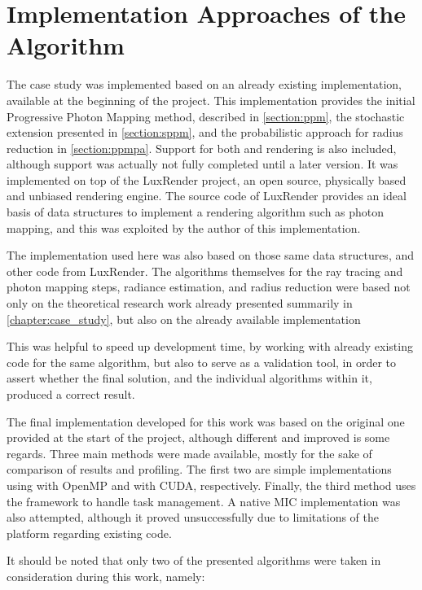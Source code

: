 \documentclass[main.tex]{subfiles}
\begin{document}
\chapter{Implementation Approaches of the Algorithm} \label{chapter:impl}

The case study was implemented based on an already existing implementation, available at the beginning of the project. This implementation provides the initial Progressive Photon Mapping method, described in \cref{section:ppm}, the stochastic extension presented in \cref{section:sppm}, and the probabilistic approach for radius reduction in \cref{section:ppmpa}. Support for both \cpu and \cuda rendering is also included, although \cuda support was actually not fully completed until a later version. It was implemented on top of the LuxRender project, an open source, physically based and unbiased rendering engine. The source code of LuxRender provides an ideal basis of data structures to implement a rendering algorithm such as photon mapping, and this was exploited by the author of this implementation.

The implementation used here was also based on those same data structures, and other code from LuxRender. The algorithms themselves for the ray tracing and photon mapping steps, radiance estimation, and radius reduction were based not only on the theoretical research work already presented summarily in \cref{chapter:case_study}, but also on the already available implementation

This was helpful to speed up development time, by working with already existing code for the same algorithm, but also to serve as a validation tool, in order to assert whether the final solution, and the individual algorithms within it, produced a correct result.

The final implementation developed for this work was based on the original one provided at the start of the project, although different and improved is some regards. Three main methods were made available, mostly for the sake of comparison of results and profiling. The first two are simple implementations using \cpus with \acs{OpenMP} and \gpus with \acs{CUDA}, respectively. Finally, the third method uses the \starpu framework to handle task management.
A native \acs{MIC} implementation was also attempted, although it proved unsuccessfully due to limitations of the platform regarding existing code.

It should be noted that only two of the presented algorithms were taken in consideration during this work, namely:
\end{document}
